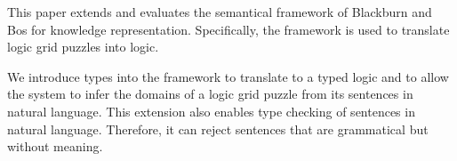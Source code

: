 This paper extends and evaluates the semantical framework of Blackburn and Bos for knowledge representation. Specifically, the framework is used to translate logic grid puzzles into logic.


We introduce types into the framework to translate to a typed logic and to allow the system to infer the domains of a logic grid puzzle from its sentences in natural language. This extension also enables type checking of sentences in natural language. Therefore, it can reject sentences that are grammatical but without meaning.

